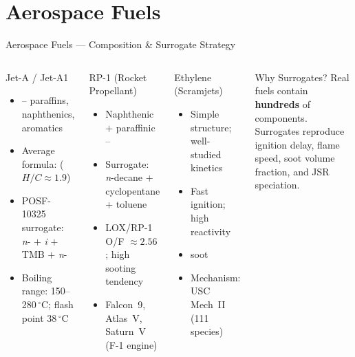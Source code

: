 \documentclass[aspectratio=169,10pt]{beamer}
\begin{document}
\section{Aerospace Fuels}

\begin{frame}{Aerospace Fuels --- Composition \& Surrogate Strategy}
  \begin{columns}[t]
    \begin{block}{Jet-A / Jet-A1}
      \begin{itemize}
        \item {}-- paraffins, naphthenics, aromatics
        \item Average formula:  ($H/C \approx 1.9$)
        \item POSF-10325 surrogate:\newline
              \textit{n}- $+$ \textit{i} $+$ TMB $+$ \textit{n}-
        \item Boiling range: 150--280\,$^\circ$C; flash point 38\,$^\circ$C
      \end{itemize}
    \end{block}
    \begin{block}{RP-1 (Rocket Propellant)}
      \begin{itemize}
        \item Naphthenic $+$ paraffinic --
        \item Surrogate: \textit{n}-decane + cyclopentane + toluene
        \item LOX/RP-1 O/F $\approx 2.56$; high sooting tendency
        \item Falcon~9, Atlas~V, Saturn~V (F-1 engine)
      \end{itemize}
    \end{block}
    \begin{block}{Ethylene  (Scramjets)}
      \begin{itemize}
        \item Simple  structure; well-studied kinetics
        \item Fast ignition; high reactivity
        \item {} soot
        \item Mechanism: USC Mech~II (111 species)
      \end{itemize}
    \end{block}
    \begin{exampleblock}{Why Surrogates?}
      \small Real fuels contain \textbf{hundreds} of components.
      Surrogates reproduce ignition delay, flame speed,
      soot volume fraction, and JSR speciation.
    \end{exampleblock}
  \end{columns}
\end{frame}
\end{document}
